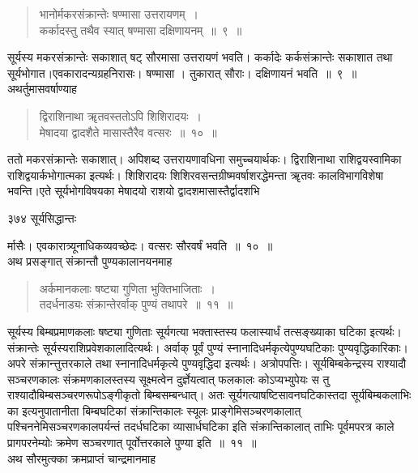 \documentclass[11pt, openany]{book}
\begin{document}

\begin{quote}
{\ssi भानोर्मकरसंक्रान्तेः षण्मासा उत्तरायणम्~।\\
कर्कादस्तु तथैव स्यात् षण्मासा दक्षिणायनम्~॥~९~॥}
\end{quote}

 सूर्यस्य मकरसंक्रान्तेः सकाशात् षट् सौरमासा उत्तरायणं भवति। कर्कादेः कर्कसंक्रान्तेः सकाशात तथा सूर्यभोगात।एवकारादन्यग्रहनिरासः। षण्मासा । तुकारात् सौराः। दक्षिणायनं भवति~॥~९~॥\\
अथर्तुमासवर्षाण्याह \textendash


\begin{quote}
{\ssi द्विराशिनाथा ॠतवस्ततोऽपि शिशिरादयः~।\\
मेषादया द्वादशैते मासास्तैरैव वत्सरः~॥~१०~॥  }
\end{quote}
 ततो मकरसंक्रान्तेः सकाशात्। अपिशब्द उत्तरायणावधिना समुच्चयार्थकः। द्विराशिनाथा राशिद्वयस्वामिका राशिद्वयार्कभोगात्मका इत्यर्थः। शिशिरादयः शिशिरवसन्तग्रीष्मवर्षाशरद्धेमन्ता ॠतवः कालविभागविशेषा भवन्ति।एते सूर्यभोगविषयका मेषादयो राशयो द्वादशमासास्तैर्द्वादशभि \textendash




\newpage


\noindent ३७४ \hspace{4cm} सूर्यसिद्धान्तः 
\vspace{1cm}


\noindent र्मासैः। एवकारात्र्यूनाधिकव्यवच्छेदः। वत्सरः सौरवर्षं भवति~॥~१०~॥ \\
\noindent अथ प्रसङ्गात् संक्रान्तौ पुण्यकालानयनमाह \textendash


 \begin{quote}  
{\ssi अर्कमानकलाः षष्ट्या गुणिता भुक्तिभाजिताः~।\\
तदर्धनाड्यः संक्रान्तेरर्वाक् पुण्यं तथापरे~॥~११~॥ }
\end{quote}
 सूर्यस्य बिम्बप्रमाणकलाः षष्ट्या गुणिताः सूर्यगत्या भक्तास्तस्य फलास्यार्धं तत्सङ्ख्याका घटिका इत्यर्थः। संक्रान्तेः सूर्यस्यराशिप्रवेशकालादित्यर्थः। अर्वाक् पूर्वं पुण्यं स्नानादिधर्मकृत्येपुण्यघटिकाः पुण्यवृद्धिकारिकाः। अपरे संक्रान्त्तुत्तरकाले तथा स्नानादिधर्मकृत्ये पुण्यवृद्धिदा इत्यर्थः। अत्रोपपत्तिः। सूर्यबिम्बकेन्द्रस्य राश्यादौ सञ्चरणकालः संक्रमणकालस्तस्य सूक्ष्मत्वेन दुर्ज्ञेयत्वात् फलकालः कोऽप्यभ्युपेयः स तु राश्यादौबिम्बसञ्चरणरूपोऽङ्गीकृतो बिम्बसम्बन्धात्। अतः सूर्यगत्याषष्टिसावनघटिकास्तदा सूर्यबिम्बकलाभिः का इत्यनुपातानीता बिम्बघटिकां संक्रान्तिकालः स्यूलः प्राङ्गेमिसञ्चरणकालात् पश्चिननेमिसञ्चरणकालपर्यन्तं तदर्धघटिका व्यासार्धघटिका इति संक्रान्तिकालात् ताभिः पूर्वमपरत्र काले प्रागपरनेम्योः क्रमेण सञ्चरणात् पूर्वोत्तरकाले पुण्या इति~॥~११~॥ \\
अथ सौरमुत्क्का क्रमप्राप्तं चान्द्रमानमाह \textendash
\end{document}
